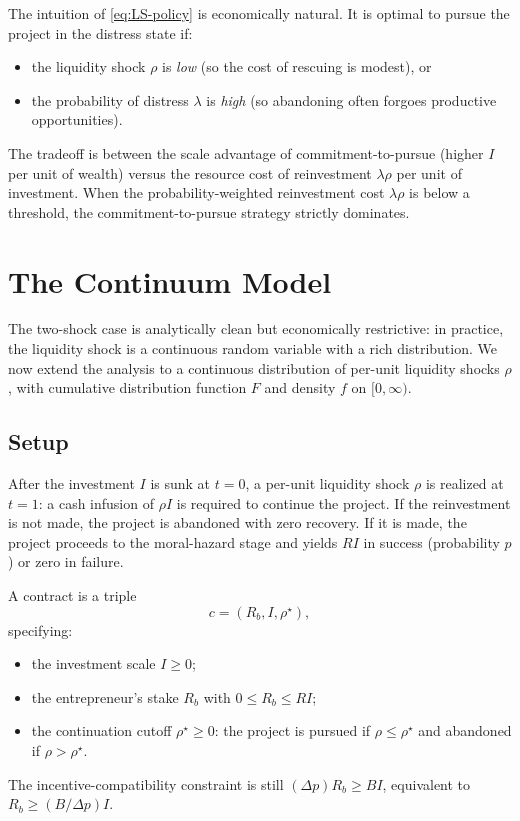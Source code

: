 \documentclass[11pt,a4paper,oneside]{book}
\def\leq{\leqslant}
\def\geq{\geqslant}
\theoremstyle{plain}
\theoremstyle{definition}
\theoremstyle{remark}
\numberwithin{equation}{chapter}
\begin{document}
The intuition of \eqref{eq:LS-policy} is economically natural.
It is optimal to pursue the project in the distress state if:
\begin{itemize}
  \item the liquidity shock $\rho$ is \emph{low} (so the cost of rescuing is modest), or
  \item the probability of distress $\lambda$ is \emph{high} (so abandoning often forgoes productive opportunities).
\end{itemize}
The tradeoff is between the scale advantage of commitment-to-pursue (higher $I$ per unit of wealth) versus the resource cost of reinvestment $\lambda\rho$ per unit of investment.
When the probability-weighted reinvestment cost $\lambda\rho$ is below a threshold, the commitment-to-pursue strategy strictly dominates.

\section{The Continuum Model}
\label{sec:LS-continuum}

The two-shock case is analytically clean but economically restrictive: in practice, the liquidity shock is a continuous random variable with a rich distribution.
We now extend the analysis to a continuous distribution of per-unit liquidity shocks $\rho$, with cumulative distribution function $F$ and density $f$ on $[0, \infty)$.

\subsection{Setup}

After the investment $I$ is sunk at $t=0$, a per-unit liquidity shock $\rho$ is realized at $t=1$: a cash infusion of $\rho I$ is required to continue the project.
If the reinvestment is not made, the project is abandoned with zero recovery.
If it is made, the project proceeds to the moral-hazard stage and yields $RI$ in success (probability $p$) or zero in failure.

A contract is a triple
\begin{equation}\label{eq:LS-contract}
  c = (R_b, I, \rho^\star),
\end{equation}
specifying:
\begin{itemize}
  \item the investment scale $I \geq 0$;
  \item the entrepreneur's stake $R_b$ with $0 \leq R_b \leq RI$;
  \item the continuation cutoff $\rho^\star \geq 0$: the project is pursued if $\rho \leq \rho^\star$ and abandoned if $\rho > \rho^\star$.
\end{itemize}
The incentive-compatibility constraint is still $(\Delta p) R_b \geq BI$, equivalent to $R_b \geq (B/\Delta p) I$.
\end{document}
